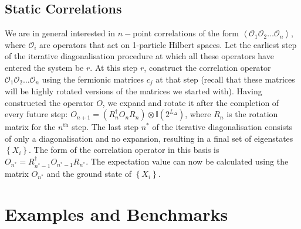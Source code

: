 \documentclass[reprint]{revtex4-2}
\begin{document}
\subsection{Static Correlations}
We are in general interested in \(n-\)point correlations of the form \(\left<\mathcal{O}_1 \mathcal{O}_2 \ldots \mathcal{O}_n\right>\), where \(\mathcal{O}_i\) are operators that act on 1-particle Hilbert spaces. Let the earliest step of the iterative diagonalisation procedure at which all these operators have entered the system be \(r\). At this step \(r\), construct the correlation operator \(\mathcal{O}_1 \mathcal{O}_2 \ldots \mathcal{O}_n\) using the fermionic matrices \(c_j\) at that step (recall that these matrices will be highly rotated versions of the matrices we started with). Having constructed the operator \(O\), we expand and rotate it after the completion of every future step: \(O_{n+1} = (R_n^\dagger O_n R_n)\otimes \mathbb{I}(2^{L_\Delta})\), where \(R_n\) is the rotation matrix for the \(n^\text{th}\) step. The last step \(n^*\) of the iterative diagonalisation consists of only a diagonalisation and no expansion, resulting in a final set of eigenstates \(\left\{ X_i \right\} \). The form of the correlation operator in this basis is \(O_{n^*} = R^\dagger_{n^*-1} O_{n^*-1} R_{n^*}\). The expectation value can now be calculated using the matrix \(O_{n^*}\) and the ground state of \(\left\{ X_i \right\} \).

\section{Examples and Benchmarks}
\end{document}
